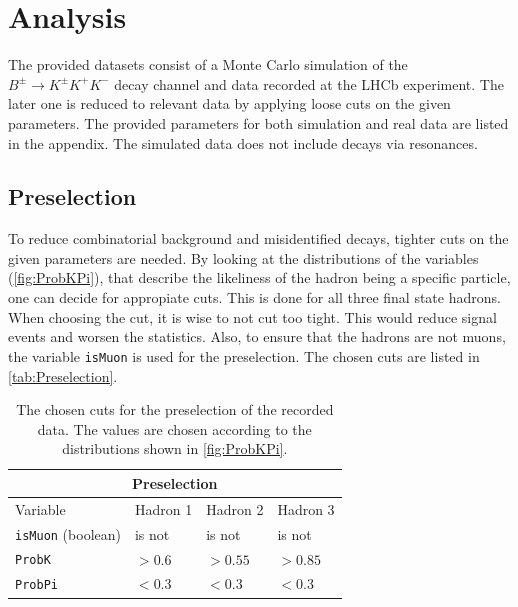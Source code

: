 \section{Analysis}
\label{sec:Analysis}

The provided datasets consist of a Monte Carlo simulation of the $B^{\pm} \rightarrow K^{\pm} K^+ K^-$ decay channel and data recorded at the LHCb
experiment. The later one is reduced to relevant data by applying loose cuts on the given parameters. The provided parameters for both simulation
and real data are listed in the appendix. The simulated data does not include decays via resonances.\\

\subsection{Preselection}

To reduce combinatorial background and misidentified decays, tighter cuts on the given parameters are needed. By looking at the distributions of the
variables (\autoref{fig:ProbKPi}), that describe the likeliness of the hadron being a specific particle, one can decide for appropiate cuts. This is done for all three final state
hadrons. When choosing the cut, it is wise to not cut too tight. This would reduce signal events and worsen the statistics. Also, to ensure that the
hadrons are not muons, the variable \texttt{isMuon} is used for the preselection. The chosen cuts are listed
in \autoref{tab:Preselection}.
\begin{table}[h!]
  \centering
    \begin{tabular}{ |p{3cm}||p{3cm}|p{3cm}|p{3cm}|  }
      \hline
      \multicolumn{4}{|c|}{Preselection} \\
      \hline
      Variable & Hadron 1 &Hadron 2 &Hadron 3\\
      \hline
      \texttt{isMuon} (boolean)   & is not &is not&  is not\\
      \texttt{ProbK}&   $> 0.6$  &$> 0.55$   &$> 0.85$\\
      \texttt{ProbPi} & $< 0.3$ & $< 0.3$&  $< 0.3$\\

      \hline
      
    \end{tabular}
    \caption{The chosen cuts for the preselection of the recorded data. The values are chosen according to the distributions shown in \autoref{fig:ProbKPi}.}
    \label{tab:Preselection}
  \end{table}



